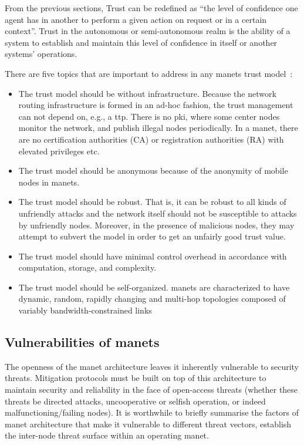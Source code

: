 From the previous sections, Trust can be redefined as ``the level of confidence one agent has in another to perform a given action on request or in a certain context''.
Trust in the autonomous or semi-autonomous realm is the ability of a system to establish and maintain this level of confidence in itself or another systems' operations.

There are five topics that are important to address in any \glspl{manet} trust model~\cite{Kamvar2003}:
%
\begin{itemize}
  \item The trust model should be without infrastructure.
    Because the network routing infrastructure is formed in an ad-hoc fashion, the trust management can not depend on, e.g., a \acrfull{ttp}.
    There is no \gls{pki}, where some center nodes monitor the network, and publish illegal nodes periodically.
    In a \gls{manet}, there are no certification authorities (CA) or registration authorities (RA) with elevated privileges etc.
  \item The trust model should be anonymous because of the anonymity of mobile nodes in \glspl{manet}.
  \item The trust model should be robust.
    That is, it can be robust to all kinds of unfriendly attacks and the network itself should not be susceptible to attacks by unfriendly nodes.
    Moreover, in the presence of malicious nodes, they may attempt to subvert the model in order to get an unfairly good trust value.
  \item The trust model should have minimal control overhead in accordance with computation, storage, and complexity.
  \item The trust model should be self-organized.
    \glspl{manet} are characterized to have dynamic, random, rapidly changing and multi-hop topologies composed of variably bandwidth-constrained links
\end{itemize}
%

\subsection{Vulnerabilities of \glspl{manet}}

The openness of the \gls{manet} architecture leaves it inherently vulnerable to security threats. 
Mitigation protocols must be built on top of this architecture to maintain security and reliability in the face of open-access threats (whether these threats be directed attacks, uncooperative or selfish operation, or indeed malfunctioning/failing nodes).
It is worthwhile to briefly summarise the factors of \gls{manet} architecture that make it vulnerable to different threat vectors, establish the inter-node threat surface within an operating \gls{manet}.

